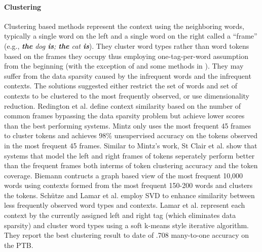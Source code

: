 \paragraph{Clustering}
Clustering based methods represent the context using the neighboring
words, typically a single word on the left and a single word on the
right called a ``frame'' (e.g., {\em {\bf the} dog {\bf is}; {\bf the}
  cat {\bf is}}).  They cluster word types rather than word tokens
based on the frames they occupy thus employing one-tag-per-word
assumption from the beginning (with the exception of
\cite{mintz2003frequent,20674613} and some methods in
\cite{Schutze:1995:DPT:976973.976994}).  They may suffer from the data
sparsity caused by the infrequent words and the infrequent contexts.
The solutions suggested either restrict the set of words and set of
contexts to be clustered to the most frequently observed, or use
dimensionality reduction.  Redington et
al.  define context similarity
based on the number of common frames bypassing the data sparsity
problem but achieve lower scores than the best performing systems.
Mintz  only uses the most frequent 45
frames to cluster tokens and achieves 98\% unsupervised accuracy on
the tokens observed in the most frequent 45 frames.  Similar to
Mintz's work, St Clair et al.  show that systems
that model the left and right frames of tokens seperately perform
better than the frequent frames both interms of token clustering
accuracy and the token coverage.  Biemann
 contructs a graph based view of
the most frequent 10,000 words using contexts formed from the most
frequent 150-200 words and clusters the tokens.  Sch\"utze
 and Lamar et
al.  employ SVD to enhance similarity
between less frequently observed word types and contexts.  Lamar et
al.  represent each context
by the currently assigned left and right tag (which eliminates data
sparsity) and cluster word types using a soft k-means style iterative
algorithm.  They report the best clustering result to date of .708
many-to-one accuracy on the PTB.

